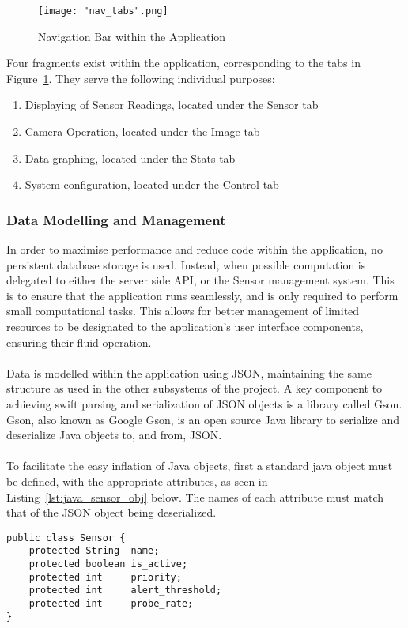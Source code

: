 \documentclass{article}
\begin{document}
\begin{figure}[H]
\centering
\texttt{[image: "nav\_tabs".png]}
\caption{Navigation Bar within the Application}
\label{fig:android_navigation}
\end{figure}

\noindent
Four fragments exist within the application, corresponding to the tabs in Figure~\ref{fig:android_navigation}. They serve the following individual purposes:
\begin{enumerate}
  \item Displaying of Sensor Readings, located under the Sensor tab
  \item Camera Operation, located under the Image tab
  \item Data graphing, located under the Stats tab
  \item System configuration, located under the Control tab
\end{enumerate}	

\subsubsection{Data Modelling and Management}
In order to maximise performance and reduce code within the application, no persistent database storage is used. Instead, when possible computation is delegated to either the server side API, or the Sensor management system. This is to ensure that the application runs seamlessly, and is only required to perform small computational tasks. This allows for better management of limited resources to be designated to the application\rq s user interface components, ensuring their fluid operation. \\\\
Data is modelled within the application using JSON, maintaining the same structure as used in the other subsystems of the project. A key component to achieving swift parsing and serialization of JSON objects is a library called Gson. Gson, also known as Google Gson, is an open source Java library to serialize and deserialize Java objects to, and from, JSON. \\\\
To facilitate the easy inflation of Java objects, first a standard java object must be defined, with the appropriate attributes, as seen in Listing~\ref{lst:java_sensor_obj} below. The names of each attribute must match that of the JSON object being deserialized. 

\begin{lstlisting}[caption={Sensor object to be serialized},label={lst:java_sensor_obj}]
public class Sensor {
    protected String  name;
    protected boolean is_active;
    protected int     priority;
    protected int     alert_threshold;
    protected int     probe_rate;
}
\end{lstlisting}	
\end{document}
